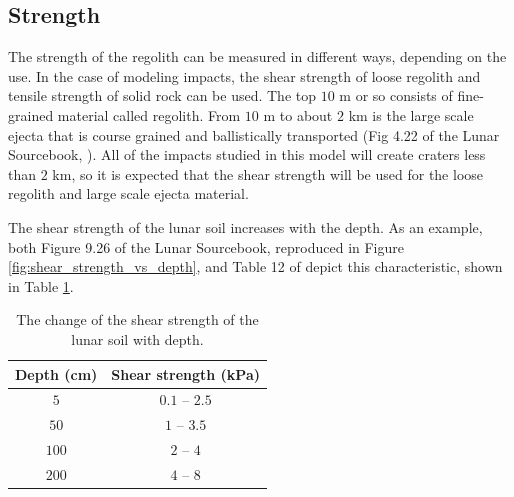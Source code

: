 \documentclass{article}
\begin{document}
\subsection{Strength}

The strength of the regolith can be measured in different ways, depending on the use. In the case of modeling impacts, the shear strength of loose regolith and tensile strength of solid rock can be used. The top $10$ m or so consists of fine-grained material called regolith. From $10$ m to about $2$ km is the large scale ejecta that is course grained and ballistically transported (Fig 4.22 of the Lunar Sourcebook, \cite{heiken1991lunar}). All of the impacts studied in this model will create craters less than $2$ km, so it is expected that the shear strength will be used for the loose regolith and large scale ejecta material.

The shear strength of the lunar soil increases with the depth. As an example, both Figure 9.26 of the Lunar Sourcebook, reproduced in Figure \ref{fig:shear_strength_vs_depth}, and Table 12 of \cite{slyuta2014physical} depict this characteristic, shown in Table \ref{tab:shear_strength}.

\begin{table}[!htb]
	\begin{center}
		\caption{The change of the shear strength of the lunar soil with depth.}
		\label{tab:shear_strength}
		\begin{tabular}{c c}
			\hline
			Depth (cm)  & Shear strength (kPa)  \\
			\hline
			$5$  & $0.1$ -- $2.5$  \\
			$50$  & $1$ -- $3.5$   \\
			$100$ & $2$ -- $4$  \\
			$200$  & $4$ -- $8$  \\\hline
		\end{tabular}
	\end{center}
\end{table}
\end{document}
